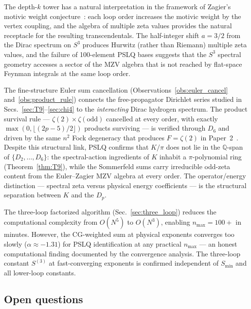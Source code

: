 \documentclass[11pt]{article}
\begin{document}
The depth-$k$ tower has a natural interpretation in the framework of
Zagier's motivic weight conjecture~\cite{zagier1994}: each loop order
increases the motivic weight by the vertex coupling, and the algebra
of multiple zeta values provides the natural receptacle for the
resulting transcendentals.  The half-integer shift $a = 3/2$ from the
Dirac spectrum on $S^3$ produces Hurwitz (rather than Riemann)
multiple zeta values, and the failure of 100-element PSLQ bases
suggests that the $S^3$ spectral geometry accesses a sector of the MZV
algebra that is not reached by flat-space Feynman integrals at the same
loop order.

The fine-structure Euler sum cancellation
(Observations~\ref{obs:euler_cancel} and~\ref{obs:product_rule}) connects
the free-propagator Dirichlet series studied in
Secs.~\ref{sec:T9}--\ref{sec:chi4} to the \emph{interacting} Dirac
hydrogen spectrum.  The product survival rule --- $\zeta(2) \times
\zeta(\text{odd})$ cancelled at every order, with exactly
$\max(0, \lfloor(2p{-}5)/2\rfloor)$ products surviving --- is verified
through $D_6$ and driven by the same $n^2$ Fock degeneracy that produces
$F = \zeta(2)$ in Paper~2~\cite{paper2}.
Despite this structural link, PSLQ confirms that $K/\pi$ does not lie in
the $\mathbb{Q}$-span of $\{D_2, \ldots, D_6\}$: the spectral-action
ingredients of $K$ inhabit a $\pi$-polynomial ring
(Theorem~\ref{thm:T9}), while the Sommerfeld sums carry irreducible
odd-zeta content from the Euler--Zagier MZV algebra at every order.
The operator/energy distinction --- spectral zeta versus physical
energy coefficients --- is the structural separation between $K$ and
the $D_p$.

The three-loop factorized algorithm (Sec.~\ref{sec:three_loop})
reduces the computational complexity from $O(N^5)$ to $O(N^3)$,
enabling $n_{\max} = 100{+}$ in minutes.  However, the CG-weighted
sum at physical exponents converges too slowly ($\alpha \approx -1.31$)
for PSLQ identification at any practical $n_{\max}$ --- an honest
computational finding documented by the convergence analysis.
The three-loop constant $S^{(3)}$ at fast-converging exponents is
confirmed independent of $S_{\min}$ and all lower-loop constants.

\subsection{Open questions}
\end{document}

